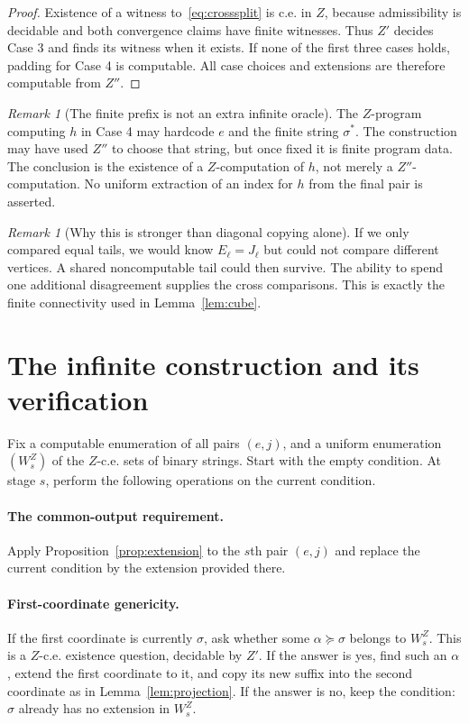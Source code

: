 \documentclass[11pt,a4paper]{article}
\theoremstyle{definition}\newtheorem{definition}[theorem]{Definition}
\theoremstyle{remark}\newtheorem{remark}[theorem]{Remark}
\begin{document}
\begin{proof}
Existence of a witness to~\eqref{eq:crosssplit} is c.e. in $Z$, because admissibility is decidable and both convergence claims have finite witnesses. Thus $Z'$ decides Case 3 and finds its witness when it exists. If none of the first three cases holds, padding for Case 4 is computable. All case choices and extensions are therefore computable from $Z''$.
\end{proof}

\begin{remark}[The finite prefix is not an extra infinite oracle]
The $Z$-program computing $h$ in Case 4 may hardcode $e$ and the finite string $\sigma^*$. The construction may have used $Z''$ to choose that string, but once fixed it is finite program data. The conclusion is the existence of a $Z$-computation of $h$, not merely a $Z''$-computation. No uniform extraction of an index for $h$ from the final pair is asserted.
\end{remark}

\begin{remark}[Why this is stronger than diagonal copying alone]
If we only compared equal tails, we would know $E_\ell=J_\ell$ but could not compare different vertices. A shared noncomputable tail could then survive. The ability to spend one additional disagreement supplies the cross comparisons. This is exactly the finite connectivity used in Lemma~\ref{lem:cube}.
\end{remark}

\section{The infinite construction and its verification}
\label{sec:construction}

Fix a computable enumeration of all pairs $(e,j)$, and a uniform enumeration $(W_s^Z)$ of the $Z$-c.e. sets of binary strings. Start with the empty condition. At stage $s$, perform the following operations on the current condition.

\paragraph{The common-output requirement.}
Apply Proposition~\ref{prop:extension} to the $s$th pair $(e,j)$ and replace the current condition by the extension provided there.

\paragraph{First-coordinate genericity.}
If the first coordinate is currently $\sigma$, ask whether some $\alpha\succeq\sigma$ belongs to $W_s^Z$. This is a $Z$-c.e. existence question, decidable by $Z'$. If the answer is yes, find such an $\alpha$, extend the first coordinate to it, and copy its new suffix into the second coordinate as in Lemma~\ref{lem:projection}. If the answer is no, keep the condition: $\sigma$ already has no extension in $W_s^Z$.
\end{document}
